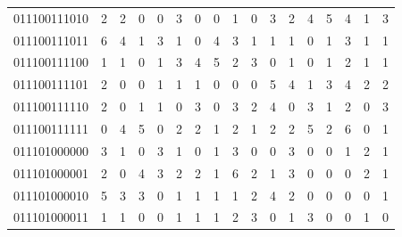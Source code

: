 \documentclass[10pt,a4paper]{article}
\begin{document}
\begin{longtable}{ |c|c|c|c|c|c|c|c|c|c|c|c|c|c|c|c|c| }
    011100111010              & 2                            & 2                                & 0                            & 0                              & 3   & 0   & 0   & 1   & 0   & 3   & 2   & 4   & 5   & 4   & 1   & 3   \\
    011100111011              & 6                            & 4                                & 1                            & 3                              & 1   & 0   & 4   & 3   & 1   & 1   & 1   & 0   & 1   & 3   & 1   & 1   \\
    011100111100              & 1                            & 1                                & 0                            & 1                              & 3   & 4   & 5   & 2   & 3   & 0   & 1   & 0   & 1   & 2   & 1   & 1   \\
    011100111101              & 2                            & 0                                & 0                            & 1                              & 1   & 1   & 0   & 0   & 0   & 5   & 4   & 1   & 3   & 4   & 2   & 2   \\
    011100111110              & 2                            & 0                                & 1                            & 1                              & 0   & 3   & 0   & 3   & 2   & 4   & 0   & 3   & 1   & 2   & 0   & 3   \\
    011100111111              & 0                            & 4                                & 5                            & 0                              & 2   & 2   & 1   & 2   & 1   & 2   & 2   & 5   & 2   & 6   & 0   & 1   \\
    011101000000              & 3                            & 1                                & 0                            & 3                              & 1   & 0   & 1   & 3   & 0   & 0   & 3   & 0   & 0   & 1   & 2   & 1   \\
    011101000001              & 2                            & 0                                & 4                            & 3                              & 2   & 2   & 1   & 6   & 2   & 1   & 3   & 0   & 0   & 0   & 2   & 1   \\
    011101000010              & 5                            & 3                                & 3                            & 0                              & 1   & 1   & 1   & 1   & 2   & 4   & 2   & 0   & 0   & 0   & 0   & 1   \\
    011101000011              & 1                            & 1                                & 0                            & 0                              & 1   & 1   & 1   & 2   & 3   & 0   & 1   & 3   & 0   & 0   & 1   & 0   \\

\end{longtable}
\end{document}
